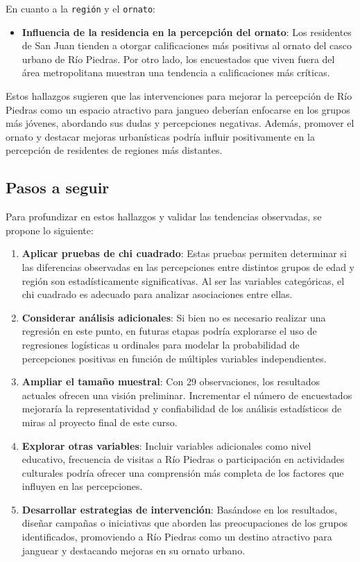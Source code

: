 \documentclass[11pt]{article}
\begin{document}
En cuanto a la \texttt{región} y el \texttt{ornato}:

\begin{itemize}
    \item \textbf{Influencia de la residencia en la percepción del ornato}: Los residentes de San Juan tienden a otorgar calificaciones más positivas al ornato del casco urbano de Río Piedras. Por otro lado, los encuestados que viven fuera del área metropolitana muestran una tendencia a calificaciones más críticas.
\end{itemize}

Estos hallazgos sugieren que las intervenciones para mejorar la percepción de Río Piedras como un espacio atractivo para jangueo deberían enfocarse en los grupos más jóvenes, abordando sus dudas y percepciones negativas. Además, promover el ornato y destacar mejoras urbanísticas podría influir positivamente en la percepción de residentes de regiones más distantes.

\subsection{Pasos a seguir}

Para profundizar en estos hallazgos y validar las tendencias observadas, se propone lo siguiente:

\begin{enumerate}
    \item \textbf{Aplicar pruebas de chi cuadrado}: Estas pruebas permiten determinar si las diferencias observadas en las percepciones entre distintos grupos de edad y región son estadísticamente significativas. Al ser las variables categóricas, el chi cuadrado es adecuado para analizar asociaciones entre ellas.
    \item \textbf{Considerar análisis adicionales}: Si bien no es necesario realizar una regresión en este punto, en futuras etapas podría explorarse el uso de regresiones logísticas u ordinales para modelar la probabilidad de percepciones positivas en función de múltiples variables independientes.
    \item \textbf{Ampliar el tamaño muestral}: Con 29 observaciones, los resultados actuales ofrecen una visión preliminar. Incrementar el número de encuestados mejoraría la representatividad y confiabilidad de los análisis estadísticos de miras al proyecto final de este curso.
    \item \textbf{Explorar otras variables}: Incluir variables adicionales como nivel educativo, frecuencia de visitas a Río Piedras o participación en actividades culturales podría ofrecer una comprensión más completa de los factores que influyen en las percepciones.
    \item \textbf{Desarrollar estrategias de intervención}: Basándose en los resultados, diseñar campañas o iniciativas que aborden las preocupaciones de los grupos identificados, promoviendo a Río Piedras como un destino atractivo para janguear y destacando mejoras en su ornato urbano.
\end{enumerate}
\end{document}
